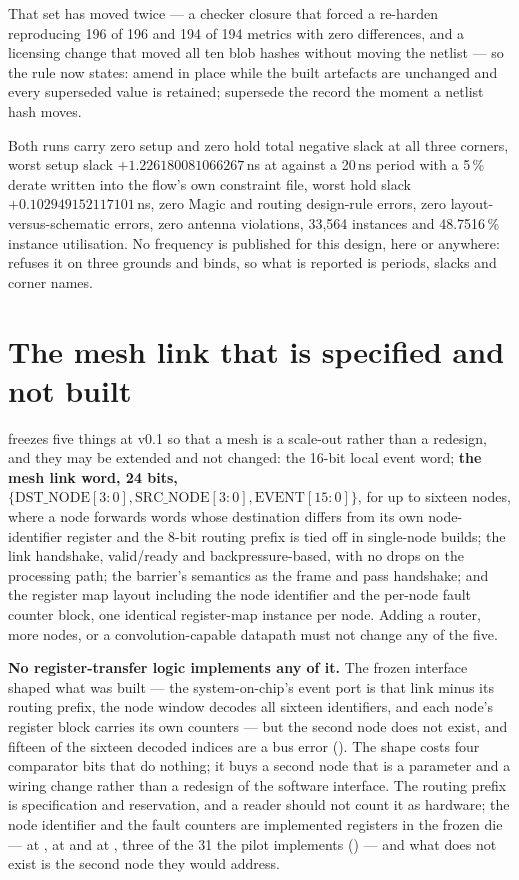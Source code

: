 That set has moved twice --- a checker closure that forced a re-harden
reproducing 196 of 196 and 194 of 194 metrics with zero differences,
and a licensing change that moved all ten blob hashes without moving
the netlist --- so the rule now states: amend in place while the built
artefacts are unchanged and every superseded value is retained;
supersede the record the moment a netlist hash moves.

Both runs carry zero setup and zero hold total negative slack at all
three corners, worst setup slack $+1.226180081066267$\,ns at
 against a 20\,ns period with a 5\,\%
derate written into the flow's own constraint file, worst hold slack
$+0.102949152117101$\,ns, zero Magic and routing design-rule errors,
zero layout-versus-schematic errors, zero antenna violations, 33,564
instances and 48.7516\,\% instance utilisation. No frequency is
published for this design, here or anywhere:  refuses it on
three grounds and  binds, so what is reported is
periods, slacks and corner names.

\section{The mesh link that is specified and not built}

 freezes five things at v0.1 so that a mesh is a
scale-out rather than a redesign, and they may be extended and not
changed: the 16-bit local event word; \textbf{the mesh link word, 24
bits, $\{\mathrm{DST\_NODE}[3{:}0], \mathrm{SRC\_NODE}[3{:}0],
\mathrm{EVENT}[15{:}0]\}$}, for up to sixteen nodes, where a node
forwards words whose destination differs from its own node-identifier
register and the 8-bit routing prefix is tied off in single-node
builds; the link handshake, valid/ready and backpressure-based, with no
drops on the processing path; the barrier's semantics as the frame and
pass handshake; and the register map layout including the node
identifier and the per-node fault counter block, one identical
register-map instance per node. Adding a router, more nodes, or a
convolution-capable datapath must not change any of the five.

\textbf{No register-transfer logic implements any of it.} The frozen
interface shaped what was built --- the system-on-chip's event port is
that link minus its routing prefix, the node window decodes all sixteen
identifiers, and each node's register block carries its own counters
--- but the second node does not exist, and fifteen of the sixteen
decoded indices are a bus error (). The shape
costs four comparator bits that do nothing; it buys a second node that
is a parameter and a wiring change rather than a redesign of the
software interface. The routing prefix is specification and reservation, and a reader
should not count it as hardware; the node identifier and the fault
counters are implemented registers in the frozen die ---
 at ,  at  and
 at , three of the 31 the pilot implements
() --- and what does not exist is the second node
they would address.


